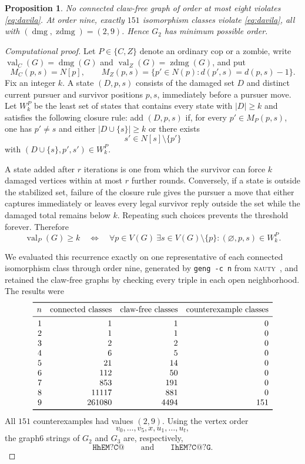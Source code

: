 \documentclass[11pt]{amsart}
\newtheorem{proposition}[theorem]{Proposition}
\DeclareMathOperator{\dmg}{dmg}
\DeclareMathOperator{\zdmg}{zdmg}
\begin{document}
\begin{proposition}\label{prop:minimality}
No connected claw-free graph of order at most eight violates
\eqref{eq:davila}. At order nine, exactly $151$ isomorphism classes violate
\eqref{eq:davila}, all with $(\dmg,\zdmg)=(2,9)$. Hence $G_2$ has minimum
possible order.
\end{proposition}

\begin{proof}[Computational proof]
Let $P\in\{C,Z\}$ denote an ordinary cop or a zombie, write
$\operatorname{val}_C(G)=\dmg(G)$ and
$\operatorname{val}_Z(G)=\zdmg(G)$, and put
\[
  M_C(p,s)=N[p],
  \qquad
  M_Z(p,s)=\{p'\in N(p):d(p',s)=d(p,s)-1\}.
\]
Fix an integer $k$. A state $(D,p,s)$ consists of the damaged set $D$ and
distinct current pursuer and survivor positions $p,s$, immediately before a
pursuer move. Let $W_k^P$ be the least set of states that contains every
state with $|D|\geq k$ and satisfies the following closure rule: add
$(D,p,s)$ if, for every $p'\in M_P(p,s)$, one has $p'\neq s$ and either
$|D\cup\{s\}|\geq k$ or there exists
\[
  s'\in N[s]\setminus\{p'\}
\]
with $(D\cup\{s\},p',s')\in W_k^P$.

A state added after $r$ iterations is one from which the survivor can force
$k$ damaged vertices within at most $r$ further rounds. Conversely, if a
state is outside the stabilized set, failure of the closure rule gives the
pursuer a move that either captures immediately or leaves every legal
survivor reply outside the set while the damaged total remains below $k$.
Repeating such choices prevents the threshold forever. Therefore
\[
  \operatorname{val}_P(G)\geq k
  \quad\Longleftrightarrow\quad
  \forall p\in V(G)\ \exists s\in V(G)\setminus\{p\}:
  (\varnothing,p,s)\in W_k^P.
\]

We evaluated this recurrence exactly on one representative of each connected
isomorphism class through order nine, generated by \texttt{geng -c n} from
\textsc{nauty}~\cite{McKayPiperno}, and retained the claw-free graphs by
checking every triple in each open neighborhood. The results were
\[
\begin{array}{rrrr}
\toprule
n & \text{connected classes} & \text{claw-free classes} &
    \text{counterexample classes}\\
\midrule
1 & 1 & 1 & 0\\
2 & 1 & 1 & 0\\
3 & 2 & 2 & 0\\
4 & 6 & 5 & 0\\
5 & 21 & 14 & 0\\
6 & 112 & 50 & 0\\
7 & 853 & 191 & 0\\
8 & 11117 & 881 & 0\\
9 & 261080 & 4494 & 151\\
\bottomrule
\end{array}
\]
All $151$ counterexamples had values $(2,9)$. Using the vertex order
\[
  v_0,\ldots,v_5,x,u_1,\ldots,u_t,
\]
the graph6 strings of $G_2$ and $G_3$ are, respectively,
\[
  \texttt{HhEM?C@}
  \qquad\text{and}\qquad
  \texttt{IhEM?C@?G}.
\]
\end{proof}
\end{document}
